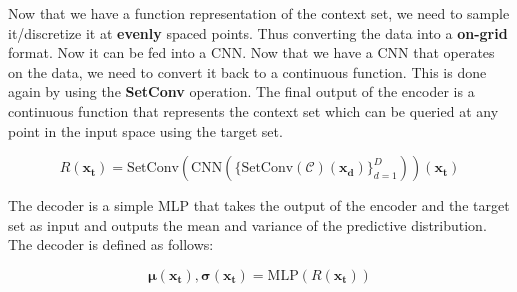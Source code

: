 \documentclass[../../main.tex]{subfiles}
\begin{document}

Now that we have a function representation of the context set, we need to sample it/discretize it at \textbf{evenly} spaced points. Thus converting the data into a \textbf{on-grid} format. Now it can be fed into a CNN. Now that we have a CNN that operates on the data, we need to convert it back to a continuous function. This is done again by using the \textbf{SetConv} operation. The final output of the encoder is a continuous function that represents the context set which can be queried at any point in the input space using the target set.

\begin{equation}
	R(\bm{x_t}) = \text{SetConv}(\text{CNN}(\{\text{SetConv}(\mathcal{C})(\bm{x_d})\}_{d=1}^{D}))(\bm{x_t})
\end{equation}



The decoder is a simple MLP that takes the output of the encoder and the target set as input and outputs the mean and variance of the predictive distribution. The decoder is defined as follows:

\begin{equation}
	\bm{\mu}(\bm{x_t}), \bm{\sigma}(\bm{x_t}) = \text{MLP}(R(\bm{x_t}))
\end{equation}


\ifSubfilesClassLoaded{%
    \printbibliography{}
}{} 
\end{document}
